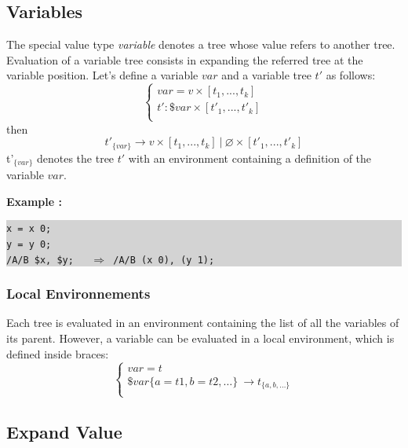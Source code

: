 \documentclass[runningheads]{llncs}
\newcommand{\exemple}	{\vspace*{1mm}\hspace*{-4mm}\textbf{Example :}}
\newcommand{\code}	[2][0.9]	{\vspace{0mm}\begin{center}\colorbox{lightgrey}{
							\begin{minipage}[t]{#1\columnwidth} 
							{\small \texttt{#2}}
							\end{minipage}}\end{center}}
\newcommand{\llist}	[1]		{\ensuremath{[#1_1,...,#1_k]}}
\newcommand{\seq}		{\ensuremath{|}}
\newcommand{\forest}	{\ensuremath{\varnothing}}
\newcommand{\etc}		{\ensuremath{\text{…}}}
\begin{document}
\subsection{Variables}
The special value type \emph{variable} denotes a tree whose value refers to another tree.
Evaluation of a variable tree consists in expanding the referred tree at the variable position.
Let's define a variable $var$ and a variable tree $t'$ as follows:
\[
\left\{
\begin{array}{l}
	var = v \times \llist{t} \\
	t' : \$var \times \llist{t'}\\
\end{array}
\right.
\]
then 
\[
	t'_{\{var\}}  \to v \times \llist{t}\ \seq\ \forest \times \llist{t'}
\]
t'$_{\{var\}}$ denotes the tree $t'$ with an environment containing a definition of the variable $var$.

\exemple
\code{x = x 0;\\
y = y 0;\\
/A/B \$x, \$y; \ \ $\Rightarrow$  /A/B (x 0), (y 1);}


\subsubsection{Local Environnements}

Each tree is evaluated in an environment containing the list of all the variables of its parent. However, a variable can be evaluated in a local environment, which is defined inside braces:
\[
\left\{
\begin{array}{l}
	var = t \\
	\$var\{a=t1, b=t2,\etc\} \ \to  t_{\{a, b,\etc\}} \\
\end{array}
\right.
\]


\subsection{Expand Value}
\end{document}
